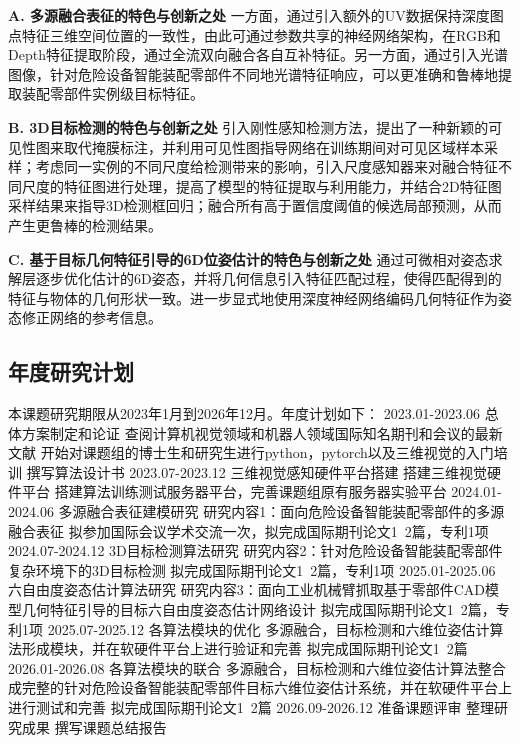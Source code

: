 \documentclass[12pt]{article}
\begin{document}

\textbf{A. 多源融合表征的特色与创新之处}
一方面，通过引入额外的UV数据保持深度图点特征三维空间位置的一致性，由此可通过参数共享的神经网络架构，在RGB和Depth特征提取阶段，通过全流双向融合各自互补特征。另一方面，通过引入光谱图像，针对危险设备智能装配零部件不同地光谱特征响应，可以更准确和鲁棒地提取装配零部件实例级目标特征。

\textbf{B. 3D目标检测的特色与创新之处}
引入刚性感知检测方法，提出了一种新颖的可见性图来取代掩膜标注，并利用可见性图指导网络在训练期间对可见区域样本采样；考虑同一实例的不同尺度给检测带来的影响，引入尺度感知器来对融合特征不同尺度的特征图进行处理，提高了模型的特征提取与利用能力，并结合2D特征图采样结果来指导3D检测框回归；融合所有高于置信度阈值的候选局部预测，从而产生更鲁棒的检测结果。

\textbf{C. 基于目标几何特征引导的6D位姿估计的特色与创新之处}
通过可微相对姿态求解层逐步优化估计的6D姿态，并将几何信息引入特征匹配过程，使得匹配得到的特征与物体的几何形状一致。进一步显式地使用深度神经网络编码几何特征作为姿态修正网络的参考信息。


\subsection{年度研究计划}

本课题研究期限从2023年1月到2026年12月。年度计划如下：
2023.01-2023.06		总体方案制定和论证
查阅计算机视觉领域和机器人领域国际知名期刊和会议的最新文献
开始对课题组的博士生和研究生进行python，pytorch以及三维视觉的入门培训
撰写算法设计书
2023.07-2023.12		三维视觉感知硬件平台搭建
搭建三维视觉硬件平台
搭建算法训练测试服务器平台，完善课题组原有服务器实验平台
2024.01-2024.06		多源融合表征建模研究
研究内容1：面向危险设备智能装配零部件的多源融合表征
拟参加国际会议学术交流一次，拟完成国际期刊论文1~2篇，专利1项
2024.07-2024.12		3D目标检测算法研究
研究内容2：针对危险设备智能装配零部件复杂环境下的3D目标检测
拟完成国际期刊论文1~2篇，专利1项
2025.01-2025.06		六自由度姿态估计算法研究
研究内容3：面向工业机械臂抓取基于零部件CAD模型几何特征引导的目标六自由度姿态估计网络设计
拟完成国际期刊论文1~2篇，专利1项
2025.07-2025.12		各算法模块的优化
多源融合，目标检测和六维位姿估计算法形成模块，并在软硬件平台上进行验证和完善
拟完成国际期刊论文1~2篇
2026.01-2026.08		各算法模块的联合
多源融合，目标检测和六维位姿估计算法整合成完整的针对危险设备智能装配零部件目标六维位姿估计系统，并在软硬件平台上进行测试和完善
拟完成国际期刊论文1~2篇
2026.09-2026.12		准备课题评审
整理研究成果
撰写课题总结报告
\end{document}

